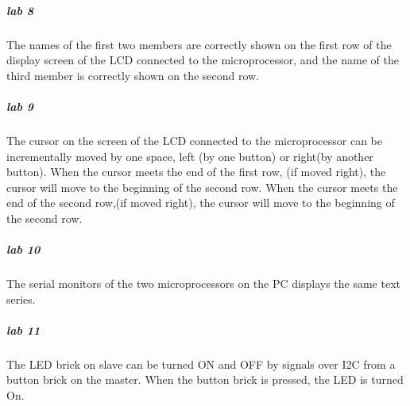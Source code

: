\subparagraph{lab 8}
The names of the first two members are correctly shown on the first row of the display screen of the LCD connected to the microprocessor, and the name of the third member is correctly shown on the second row.
\subparagraph{lab 9}
The cursor on the screen of the LCD connected to the microprocessor can be incrementally moved by one space, left (by one button) or right(by another button). When the cursor meets the end of the first row, (if moved right), the cursor will move to the beginning of the second row. When the cursor meets the end of the second row,(if moved right), the cursor will move to the beginning of the second row.
\subparagraph{lab 10}
The serial monitors of the two microprocessors on the PC displays the same text series.
\subparagraph{lab 11}
The LED brick on slave can be turned ON and OFF by signals over I2C from a button brick on the master. When the button brick is pressed, the LED is turned On.